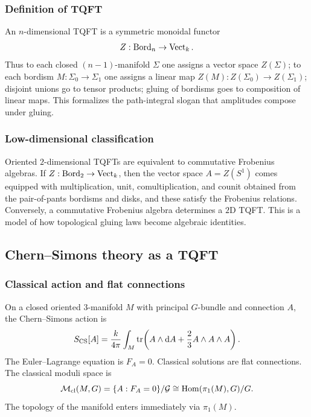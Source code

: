 \subsubsection{Definition of TQFT}

An $n$-dimensional TQFT is a symmetric monoidal functor
\begin{equation}
  Z : \operatorname{Bord}_n \to \operatorname{Vect}_k.
\end{equation}
Thus to each closed $(n-1)$-manifold $\Sigma$ one assigns a vector space $Z(\Sigma)$; to each bordism $M : \Sigma_0 \to \Sigma_1$ one assigns a linear map $Z(M): Z(\Sigma_0) \to Z(\Sigma_1)$; disjoint unions go to tensor products; gluing of bordisms goes to composition of linear maps. This formalizes the path-integral slogan that amplitudes compose under gluing.

\subsubsection{Low-dimensional classification}

Oriented $2$-dimensional TQFTs are equivalent to commutative Frobenius algebras. If $Z : \operatorname{Bord}_2 \to \operatorname{Vect}_k$, then the vector space $A=Z(S^1)$ comes equipped with multiplication, unit, comultiplication, and counit obtained from the pair-of-pants bordisms and disks, and these satisfy the Frobenius relations. Conversely, a commutative Frobenius algebra determines a $2$D TQFT. This is a model of how topological gluing laws become algebraic identities.

\subsection{Chern--Simons theory as a TQFT}

\subsubsection{Classical action and flat connections}

On a closed oriented $3$-manifold $M$ with principal $G$-bundle and connection $A$, the Chern--Simons action is
\begin{equation}
  S_{\operatorname{CS}}[A]
  =
  \frac{k}{4\pi}
  \int_M \operatorname{tr}\!\left(A\wedge \mathrm{d} A + \frac{2}{3}A\wedge A\wedge A\right).
\end{equation}
The Euler--Lagrange equation is $F_A=0$. Classical solutions are flat connections. The classical moduli space is
\begin{equation}
  \mathcal{M}_{\mathrm{cl}}(M,G)
  =
  \{A : F_A=0\}/\mathcal{G}
  \cong
  \operatorname{Hom}(\pi_1(M),G)/G.
\end{equation}
The topology of the manifold enters immediately via $\pi_1(M)$.

